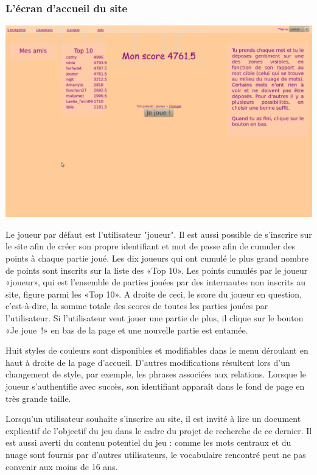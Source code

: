 \documentclass[a4paper,11pt,french]{article}
\begin{document}
\subsubsection{L'écran d'accueil du site}
\begin{center}
\includegraphics[width=14cm]{img/PtiClicAccueil.png}
\end{center}

Le joueur par défaut est l'utilisateur "joueur". Il est aussi possible de s'inscrire sur le site afin de créer son propre identifiant et mot
de passe afin de cumuler des points à chaque partie joué. Les dix joueurs qui ont cumulé le plus grand nombre de points sont inscrits sur la
liste des «Top 10». Les points cumulés par le joueur «joueur», qui est l'ensemble de parties jouées par des internautes non inscrits au
site, figure parmi les «Top 10». A droite de ceci, le score du joueur en question, c'est-à-dire, la somme totale des scores de toutes les
parties jouées par l'utilisateur. Si l'utilisateur veut jouer une partie de plus, il clique sur le bouton «Je joue~!» en bas de la page et
une nouvelle partie est entamée.

Huit styles de couleurs sont disponibles et modifiables dans le menu déroulant en haut à droite de la page d'accueil. D'autres modifications résultent lors d'un changement de style, par exemple, les phrases associées aux relations. Lorsque le joueur s'authentifie avec succès, son identifiant apparaît dans le fond de page en très grande taille.

Lorsqu'un utilisateur souhaite s'inscrire au site, il est invité à lire un document explicatif de l'objectif du jeu dans le cadre du projet
de recherche de ce dernier. Il est aussi averti du contenu potentiel du jeu : comme les mots centraux et du nuage sont fournis par d'autres
utilisateurs, le vocabulaire rencontré peut ne pas convenir aux moins de 16 ans.
\end{document}
